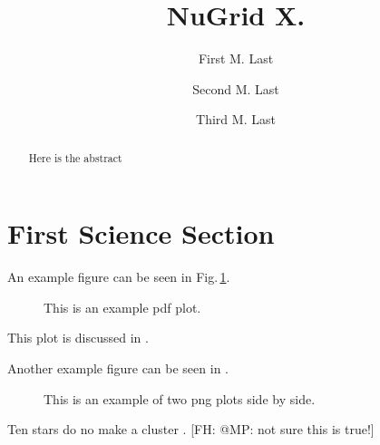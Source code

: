 \documentclass[twocolumn]{aastex61}
\newcommand{\shortcomment}[3]{\textcolor{#1}{[#2: #3]}}
\newcommand{\fhcom}[1]{\shortcomment{PineGreen}{FH}{#1}}
\begin{document}
\title{NuGrid X. }
\author{First M. Last}

\author{Second  M. Last}

\author{Third M. Last}




\begin{abstract}
  Here is the abstract
\end{abstract}

\keywords{}

\section{First Science Section}\label{s.science1} 


An example figure can be seen in Fig.\,\ref{fig:general}.
\begin{figure}[ht!]
\caption{\label{fig:general}
This is an example pdf plot.}
\end{figure}

This plot is discussed in \citet{lau:12}.

Another example figure can be seen in .
\begin{figure*}[ht!]
\caption{This is an example of two png plots side by side.
  \label{fig:two-plotexample}}
\end{figure*}

Ten stars do no make a cluster \citep{2001A&A...369..574V}.
\fhcom{@MP: not sure this is true!}






\end{document}
